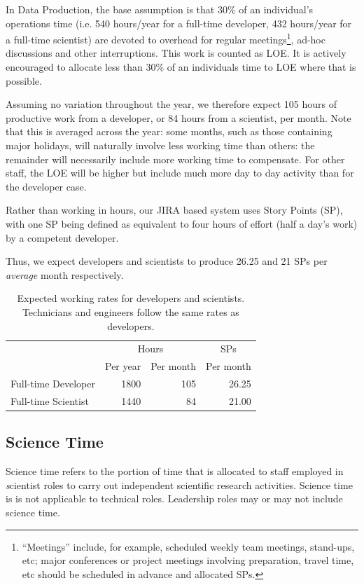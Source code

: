 In Data Production, the base assumption is that 30\% of an individual's \RO operations time (i.e. 540 hours/year for a full-time developer, 432 hours/year for a full-time scientist) are devoted to
overhead for regular meetings\footnote{``Meetings'' include, for example, scheduled weekly team meetings, stand-ups, etc;
major conferences or project meetings involving preparation, travel time, etc should be scheduled in advance and allocated \glspl{SP}.},
ad-hoc discussions and other interruptions.
This work is counted as \gls{LOE}.
It is actively encouraged to allocate less than 30\% of an individuals time to \gls{LOE} where that is possible.

Assuming no variation throughout the year, we therefore expect 105 hours of productive work from a developer, or 84 hours from a scientist, per month.
Note that this is averaged across the year: some months, such as those containing major holidays, will naturally involve less working time than others: the remainder will necessarily include more working time to compensate. For other staff, the \gls{LOE} will be higher but include much more day to day activity than for the developer case.

Rather than working in hours, our \gls{JIRA} based system uses Story Points (\gls{SP}), with one \gls{SP} being defined as equivalent to four hours of effort (half a day's work) by a competent developer.

Thus, we expect developers and scientists to produce 26.25 and 21 \glspl{SP} per \emph{average} month respectively.

\begin{table}
\begin{longtable}[]{@{}lrrr@{}}
\hline
          & \multicolumn{2}{c}{Hours} & \multicolumn{1}{c}{\glspl{SP}} \\
          & Per year & Per month      & Per month \\
\hline
Full-time Developer & 1800     & 105            & 26.25 \\
Full-time Scientist & 1440     &  84            & 21.00 \\
\hline
\end{longtable}
\caption{Expected working rates for developers and scientists. Technicians and engineers follow the same rates as developers.}
\label{tab:working-rate}
\end{table}

\subsection{Science Time}
Science time refers to the portion of time that is allocated to staff employed in  {\emph scientist}  roles to carry out independent scientific research activities.  
Science time is is not applicable to  technical roles. 
Leadership roles may or may not include science time. 

